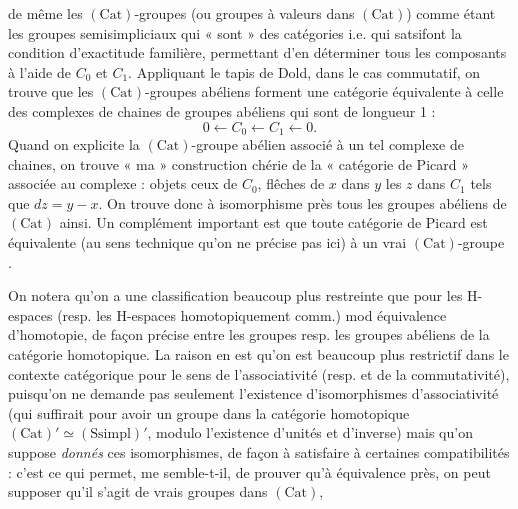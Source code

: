 \documentclass[11pt,a4paper]{article}
\begin{document}
de même les $(\mathrm{Cat})$-groupes (ou groupes à valeurs dans
$(\mathrm{Cat})$) comme étant les groupes semisimpliciaux qui « sont » des
catégories i.e. qui satsifont la condition d'exactitude familière,
permettant d'en déterminer tous les composants à l'aide de $C_0$ et $C_1$.
Appliquant le tapis de Dold, dans le cas commutatif, on trouve que les
$(\mathrm{Cat})$-groupes abéliens forment une catégorie équivalente à celle
des complexes de chaines de groupes abéliens qui sont de longueur 1 :
\[
0 \longleftarrow C_0 \longleftarrow C_1 \longleftarrow 0 .
\]
Quand on explicite la $(\mathrm{Cat})$-groupe abélien associé à un tel
complexe de chaines, on trouve « ma » construction chérie de la « catégorie
de Picard » associée au complexe : objets ceux de $C_0$, flêches de $x$
dans $y$ les $z$ dans $C_1$ tels que $dz = y - x$. On trouve donc à
isomorphisme près tous les groupes abéliens de $(\mathrm{Cat})$ ainsi. Un
complément important est que toute catégorie de Picard
 est équivalente (au sens technique qu'on ne
précise pas ici) à un vrai $(\mathrm{Cat})$-groupe
. 

On notera qu'on a une classification beaucoup plus restreinte que pour les
H-espaces (resp. les H-espaces homotopiquement comm.) mod équivalence
d'homotopie, de façon précise entre les groupes resp. les groupes abéliens
de la catégorie homotopique. La raison en est qu'on est beaucoup plus
restrictif dans le contexte catégorique pour le sens de l'associativité
(resp. et de la commutativité), puisqu'on ne demande pas seulement
l'existence d'isomorphismes d'associativité (qui suffirait pour avoir un
groupe dans la catégorie homotopique
$(\mathrm{Cat})' \simeq (\mathrm{Ssimpl})'$, modulo l'existence d'unités et
d'inverse) mais qu'on suppose \emph{donnés} ces isomorphismes, de façon à
satisfaire à certaines compatibilités : c'est ce qui permet, me
semble-t-il, de prouver qu'à équivalence près, on peut supposer qu'il
s'agit de vrais groupes dans $(\mathrm{Cat})$,
\end{document}
